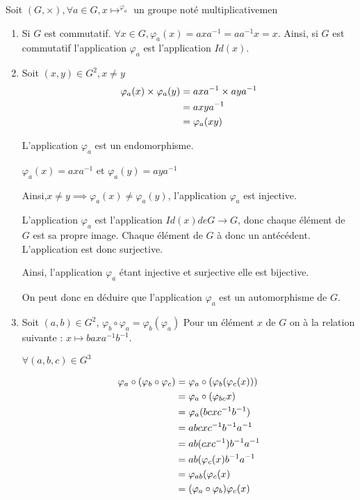 \documentclass[a4paper,10pt]{article}
\begin{document}
Soit $(G,\times), \forall a \in G,x\longmapsto^{ \varphi_a}$ un groupe noté multiplicativemen
\begin{enumerate}

\item
	Si $G$ est commutatif.
	$\forall x \in G, \varphi_a(x)=axa^{-1}=aa^{-1}x=x$.
	Ainsi, si $G$ est commutatif l'application $\varphi_a$ est l'application $Id(x)$.
	
\bigskip

\item
Soit $(x,y) \in G^2, x \neq y $
\begin{align}
	\varphi_a(x) \times \varphi_a(y) &= axa^{-1} \times aya^{-1}\notag \\
	&= axya^{-1} \notag \\
	&= \varphi_a(xy) \notag
\end{align}

L'application $\varphi_a$ est un endomorphisme.

$\varphi_a(x)=axa^{-1}  $ et $\varphi_a(y)=aya^{-1}  $

Ainsi,$ x \neq y \implies \varphi_a(x) \neq \varphi_a(y)$, l'application $\varphi_a$ est injective.

L'application $ \varphi_a $ est l'application $Id(x) de G\longrightarrow G$, donc chaque élément de $G$ est sa propre image. Chaque élément de $G$ à donc un antécédent. L'application est donc surjective.

Ainsi, l'application $ \varphi_a $ étant injective et surjective elle est bijective.

On peut donc en déduire que l'application $ \varphi_a $ est un automorphisme de $G$.

\bigskip

\item
Soit $ (a,b) \in G^2$, $\varphi_b \circ\varphi_a=\varphi_b (\varphi_a)$
Pour un élément $x$ de $G$ on à la relation suivante :
$x\longmapsto baxa^{-1}b^{-1}$.


$\forall (a,b,c) \in G^3 $

\begin{align}
	\varphi_a \circ(\varphi_b \circ\varphi_c) &= \varphi_a \circ(\varphi_b(\varphi_c(x))) \notag \\
	&=  \varphi_a \circ(\varphi_{bc}x)\notag \\
	&= \varphi_a(bcxc^{-1}b^{-1})\notag \\
	&= abcxc^{-1}b^{-1}a^{-1}\notag \\
	&= ab(cxc^{-1})b^{-1}a^{-1}\notag \\
	&= ab(\varphi_c(x)b^{-1}a^{-1}\notag \\
	&= \varphi_{ab}(\varphi_c(x)\notag \\
	&= (\varphi_a \circ\varphi_b)\varphi_c(x)\notag 
\end{align}


\end{enumerate}
\end{document}
